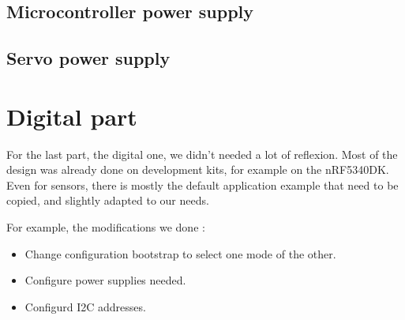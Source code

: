 \subsection{Microcontroller power supply}

\subsection{Servo power supply}

\section{Digital part}
For the last part, the digital one, we didn't needed a lot of reflexion. Most of the design was already done on 
development kits, for example on the nRF5340DK\cite{nRF5340DK}. Even for sensors, there is mostly the default 
application example that need to be copied, and slightly adapted to our needs.

For example, the modifications we done : 
\begin{itemize}
    \item   Change configuration bootstrap to select one mode of the other.
    \item   Configure power supplies needed.
    \item   Configurd I2C addresses.
\end{itemize}





